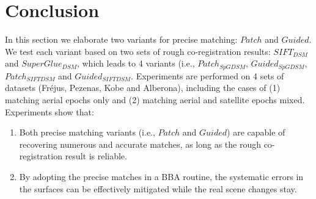 

\section{Conclusion}
In this section we elaborate two variants for precise matching: $Patch$ and $Guided$. 
We test each variant based on two sets of rough co-registration results: $SIFT_{DSM}$ and $SuperGlue_{DSM}$, which leads to 4 variants (i.e.,  $Patch_{SpGDSM}$,  $Guided_{SpGDSM}$,  $Patch_{SIFTDSM}$ and  $Guided_{SIFTDSM}$.
Experiments are performed on 4 sets of datasets (Fr{\'e}jus, Pezenas, Kobe and Alberona), including the cases of (1) matching aerial epochs only and (2) matching aerial and satellite epochs mixed.
Experiments show that:\\
\begin{enumerate}
	\item Both precise matching variants (i.e., $Patch$ and $Guided$) are capable of recovering numerous and accurate matches, as long as the rough co-registration result is reliable.\\
	\item By adopting the precise matches in a \ac{BBA} routine, the systematic errors in the surfaces can be effectively mitigated while the real scene changes stay.
\end{enumerate}


